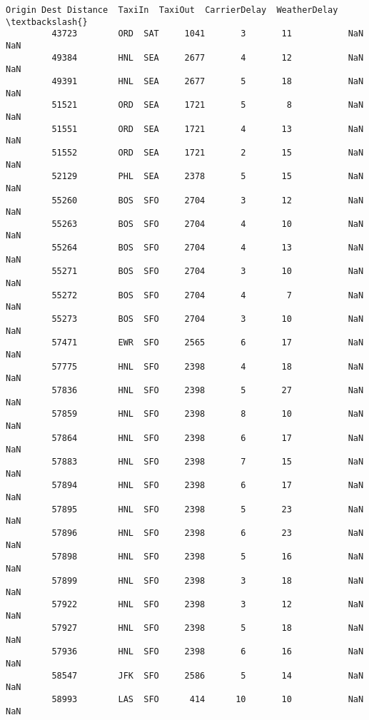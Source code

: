 \documentclass[11pt]{article}
\begin{document}
\begin{Verbatim}[commandchars=\\\{\}]
                   Origin Dest Distance  TaxiIn  TaxiOut  CarrierDelay  WeatherDelay  \textbackslash{}
         43723        ORD  SAT     1041       3       11           NaN           NaN   
         49384        HNL  SEA     2677       4       12           NaN           NaN   
         49391        HNL  SEA     2677       5       18           NaN           NaN   
         51521        ORD  SEA     1721       5        8           NaN           NaN   
         51551        ORD  SEA     1721       4       13           NaN           NaN   
         51552        ORD  SEA     1721       2       15           NaN           NaN   
         52129        PHL  SEA     2378       5       15           NaN           NaN   
         55260        BOS  SFO     2704       3       12           NaN           NaN   
         55263        BOS  SFO     2704       4       10           NaN           NaN   
         55264        BOS  SFO     2704       4       13           NaN           NaN   
         55271        BOS  SFO     2704       3       10           NaN           NaN   
         55272        BOS  SFO     2704       4        7           NaN           NaN   
         55273        BOS  SFO     2704       3       10           NaN           NaN   
         57471        EWR  SFO     2565       6       17           NaN           NaN   
         57775        HNL  SFO     2398       4       18           NaN           NaN   
         57836        HNL  SFO     2398       5       27           NaN           NaN   
         57859        HNL  SFO     2398       8       10           NaN           NaN   
         57864        HNL  SFO     2398       6       17           NaN           NaN   
         57883        HNL  SFO     2398       7       15           NaN           NaN   
         57894        HNL  SFO     2398       6       17           NaN           NaN   
         57895        HNL  SFO     2398       5       23           NaN           NaN   
         57896        HNL  SFO     2398       6       23           NaN           NaN   
         57898        HNL  SFO     2398       5       16           NaN           NaN   
         57899        HNL  SFO     2398       3       18           NaN           NaN   
         57922        HNL  SFO     2398       3       12           NaN           NaN   
         57927        HNL  SFO     2398       5       18           NaN           NaN   
         57936        HNL  SFO     2398       6       16           NaN           NaN   
         58547        JFK  SFO     2586       5       14           NaN           NaN   
         58993        LAS  SFO      414      10       10           NaN           NaN   

\end{Verbatim}
\end{document}
